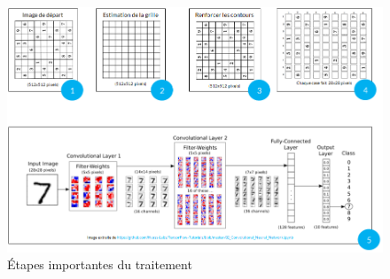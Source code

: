 \documentclass[12pt]{article}
\begin{document}
\begin{figure}[!h]
	\centering
   	\includegraphics[scale = 0.68]{reco.png}
   	\caption{\label{etape} Étapes importantes du traitement}
\end{figure}
\end{document}
